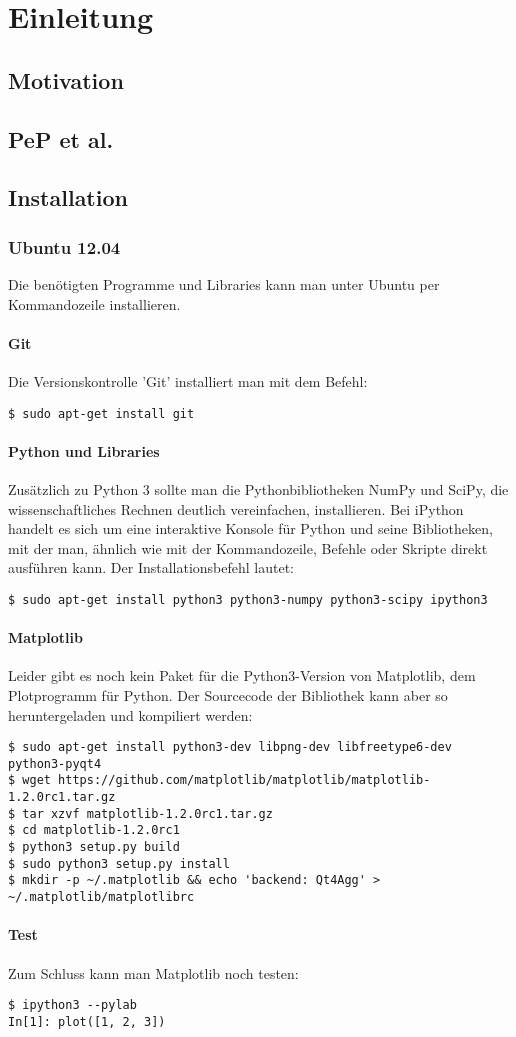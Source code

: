 \chapter{Einleitung}
\section{Motivation}
\section{PeP et al.}

\section{Installation}
\subsection{Ubuntu 12.04}
Die benötigten Programme und Libraries kann man unter Ubuntu per Kommandozeile installieren.

\subsubsection{Git}
Die Versionskontrolle 'Git' installiert man mit dem Befehl:
\begin{verbatim}
$ sudo apt-get install git
\end{verbatim}

\subsubsection{Python und Libraries}
Zusätzlich zu Python 3 sollte man die Pythonbibliotheken NumPy und SciPy, die wissenschaftliches Rechnen deutlich vereinfachen, installieren.
Bei iPython handelt es sich um eine interaktive Konsole für Python und seine Bibliotheken, mit der man, ähnlich wie mit der Kommandozeile, Befehle oder Skripte direkt ausführen kann.
Der Installationsbefehl lautet:
\begin{verbatim}
$ sudo apt-get install python3 python3-numpy python3-scipy ipython3
\end{verbatim}

\subsubsection{Matplotlib}
Leider gibt es noch kein Paket für die Python3-Version von Matplotlib, dem Plotprogramm für Python.
Der Sourcecode der Bibliothek kann aber so heruntergeladen und kompiliert werden:
\begin{verbatim}
$ sudo apt-get install python3-dev libpng-dev libfreetype6-dev python3-pyqt4
$ wget https://github.com/matplotlib/matplotlib/matplotlib-1.2.0rc1.tar.gz
$ tar xzvf matplotlib-1.2.0rc1.tar.gz
$ cd matplotlib-1.2.0rc1
$ python3 setup.py build
$ sudo python3 setup.py install
$ mkdir -p ~/.matplotlib && echo 'backend: Qt4Agg' > ~/.matplotlib/matplotlibrc
\end{verbatim}

\subsubsection{Test}
Zum Schluss kann man Matplotlib noch testen:
\begin{verbatim}
$ ipython3 --pylab
In[1]: plot([1, 2, 3])
\end{verbatim}
